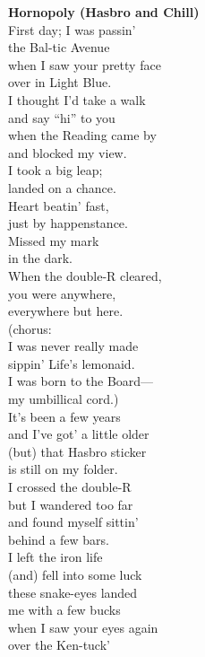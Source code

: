 \documentclass{article}
\begin{document}
\begin{center}
\newcommand{\vs}{\vspace*{2ex}}
\noindent
\textbf{Hornopoly (Hasbro and Chill)} \\
\vs
First day; I was passin' \\ %
the Bal-tic Avenue \\
when I saw your pretty face \\
over in Light Blue. \\
I thought I'd take a walk \\
and say ``hi'' to you \\
when the Reading came by \\
and blocked my view. \\
\vs
I took a big leap; \\
landed on a chance. \\
Heart beatin' fast, \\
just by happenstance. \\
Missed my mark \\
in the dark. \\
When the double-R cleared, \\
you were anywhere, \\
everywhere but here. \\
\vs
(chorus: \\
  I was never really made \\
  sippin' Life's lemonaid. \\
  I was born to the Board--- \\
  my umbillical cord.) \\
\vs
It's been a few years \\
and I've got' a little older \\
(but) that Hasbro sticker \\
is still on my folder. \\ %
I crossed the double-R \\
but I wandered too far \\
and found myself sittin' \\
behind a few bars. \\
\vs
I left the iron life \\
(and) fell into some luck \\
these snake-eyes landed \\
me with a few bucks \\
when I saw your eyes again \\
over the Ken-tuck' \\

\end{center}
\end{document}
